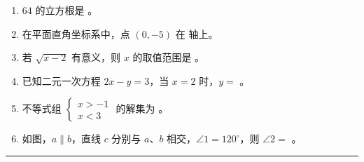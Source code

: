 \documentclass[12pt, a4paper]{ctexart}
\newcommand{\blank}[1]{\underline{\hspace{#1}}}
\begin{document}
\begin{enumerate}[label=\textbf{\arabic*.}, leftmargin=2.5em, resume]

\item $64$ 的立方根是 \blank{2cm} 。

\vspace{6pt}

\item 在平面直角坐标系中，点 $(0, -5)$ 在 \blank{2cm} 轴上。

\vspace{6pt}

\item 若 $\sqrt{x-2}$ 有意义，则 $x$ 的取值范围是 \blank{2cm} 。

\vspace{6pt}

\item 已知二元一次方程 $2x - y = 3$，当 $x = 2$ 时，$y = $ \blank{2cm} 。

\vspace{6pt}

\item 不等式组 $\begin{cases} x > -1 \\ x < 3 \end{cases}$ 的解集为 \blank{2cm} 。

\vspace{6pt}

\item 如图，$a \parallel b$，直线 $c$ 分别与 $a$、$b$ 相交，$\angle 1 = 120^{\circ}$，则 $\angle 2 = $ \blank{2cm} 。

\end{enumerate}

\vspace{10pt}
\noindent\rule{\textwidth}{0.8pt}

\vspace{8pt}

\vspace{6pt}
\end{document}
